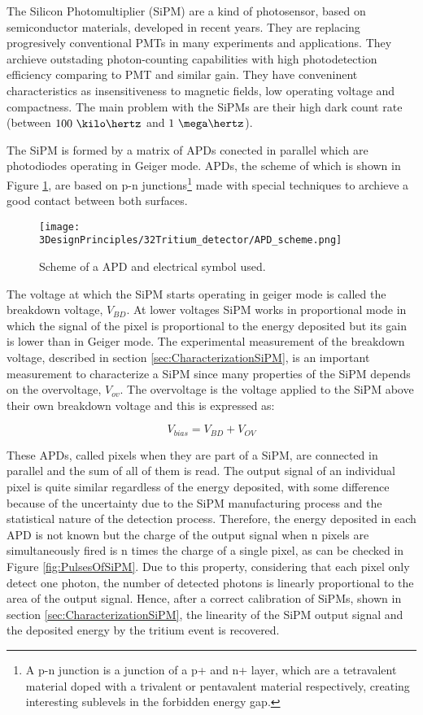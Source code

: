 The Silicon Photomultiplier (SiPM) are a kind of photosensor, based on semiconductor materials, developed in recent years. They are replacing progresively conventional PMTs in many experiments and applications. They archieve outstading photon-counting capabilities with high photodetection efficiency comparing to PMT and similar gain. They have conveninent characteristics as insensitiveness to magnetic fields, low operating voltage and compactness. The main problem with the SiPMs are their high dark count rate (between $100~\kilo\hertz$ and $1~\mega\hertz$).

The SiPM is formed by a matrix of APDs conected in parallel which are photodiodes operating in Geiger mode. APDs, the scheme of which is shown in Figure \ref{fig:SchemeAPD}, are based on p-n junctions\footnote{A p-n junction is a junction of a p+ and n+ layer, which are a tetravalent material doped with a trivalent or pentavalent material respectively, creating interesting sublevels in the forbidden energy gap.} made with special techniques to archieve a good contact between both surfaces.

\begin{figure}[htbp]
\centering
\texttt{[image: 3DesignPrinciples/32Tritium\_detector/APD\_scheme.png]}
\caption{Scheme of a APD and electrical symbol used.\label{fig:SchemeAPD}~\cite{OSI}}
\end{figure}
 

The voltage at which the SiPM starts operating in geiger mode is called the breakdown voltage, $V_ {BD}$. At lower voltages SiPM works in proportional mode in which the signal of the pixel is proportional to the energy deposited but its gain is lower than in Geiger mode. The experimental measurement of the breakdown voltage, described in section \ref{sec:CharacterizationSiPM}, is an important measurement to characterize a SiPM since many properties of the SiPM depends on the overvoltage, $V_{ov}$. The overvoltage is the voltage applied to the SiPM above their own breakdown voltage and this is expressed as:

\begin{equation}
V_{bias}=V_{BD}+V_{OV}
\label{overvoltage}
\end{equation}

These APDs, called pixels when they are part of a SiPM, are connected in parallel and the sum of all of them is read. The output signal of an individual pixel is quite similar regardless of the energy deposited, with some difference because of the uncertainty due to the SiPM manufacturing process and the statistical nature of the detection process. Therefore, the energy deposited in each APD is not known but the charge of the output signal when n pixels are simultaneously fired is n times the charge of a single pixel, as can be checked in Figure \ref{fig:PulsesOfSiPM}. Due to this property, considering that each pixel only detect one photon, the number of detected photons is linearly proportional to the area of the output signal. Hence, after a correct calibration of SiPMs, shown in section \ref{sec:CharacterizationSiPM}, the linearity of the SiPM output signal and the deposited energy by the tritium event is recovered.


